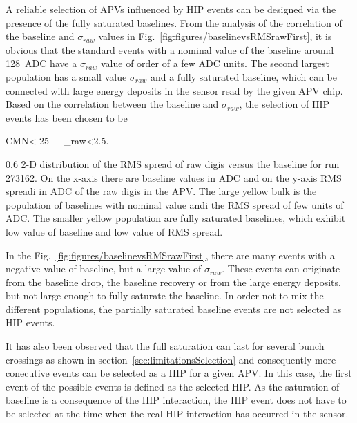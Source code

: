 A reliable selection of APVs influenced by HIP events can be designed via the presence of the fully saturated baselines. From the analysis of the correlation of the baseline and $\sigma_{raw}$ values in Fig.~\ref{fig:figures/baselinevsRMSrawFirst}, it is obvious that the standard events with a nominal value of the baseline around 128~ADC have a $\sigma_{raw}$ value of order of a few ADC units. The second largest population has a small value $\sigma_{raw}$ and a fully saturated baseline, which can be connected with large energy deposits in the sensor read by the given APV chip. Based on the correlation between the baseline and $\sigma_{raw}$, the selection of HIP events has been chosen to be 

{
CMN<-25~~~\sigma_{raw}<2.5.
}

                 {0.6}       %
                 {2-D distribution of the RMS spread of raw digis versus the baseline for run 273162. On the x-axis there are baseline values in ADC and on the y-axis RMS spreadi in ADC of the raw digis in the APV. The large yellow bulk is the population of baselines with nominal value andi the RMS spread of few units of ADC. The smaller yellow population are fully saturated baselines, which exhibit low value of baseline and low value of RMS spread. } %

In the Fig.~\ref{fig:figures/baselinevsRMSrawFirst}, there are many events with a negative value of baseline, but a large value of $\sigma_{raw}$. These events can originate from the baseline drop, the baseline recovery or from the large energy deposits, but not large enough to fully saturate the baseline. In order not to mix the different populations, the partially saturated baseline events are not selected as HIP events. 

It has also been observed that the full saturation can last for several bunch crossings as shown in section~\ref{sec:limitationsSelection} and consequently more conecutive events can be selected as a HIP for a given APV. In this case, the first event of the possible events is defined as the selected HIP. As the saturation of baseline is a consequence of the HIP interaction, the HIP event does not have to be selected at the time when the real HIP interaction has occurred in the sensor. 



